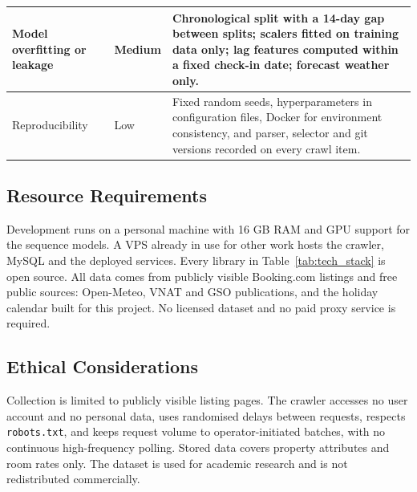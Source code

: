 \begin{longtable}{|p{3.5cm}|p{1.7cm}|p{9.0cm}|}
\hline
Model overfitting or leakage & Medium & Chronological split with a 14-day gap between splits; scalers fitted on training data only; lag features computed within a fixed check-in date; forecast weather only. \\
\hline
Reproducibility & Low & Fixed random seeds, hyperparameters in configuration files, Docker for environment consistency, and parser, selector and git versions recorded on every crawl item. \\
\end{longtable}

\subsection{Resource Requirements}

Development runs on a personal machine with 16 GB RAM and GPU support for the sequence models. A VPS already in use for other work hosts the crawler, MySQL and the deployed services. Every library in Table~\ref{tab:tech_stack} is open source. All data comes from publicly visible Booking.com listings and free public sources: Open-Meteo, VNAT and GSO publications, and the holiday calendar built for this project. No licensed dataset and no paid proxy service is required.

\subsection{Ethical Considerations}

Collection is limited to publicly visible listing pages. The crawler accesses no user account and no personal data, uses randomised delays between requests, respects \texttt{robots.txt}, and keeps request volume to operator-initiated batches, with no continuous high-frequency polling. Stored data covers property attributes and room rates only. The dataset is used for academic research and is not redistributed commercially.
